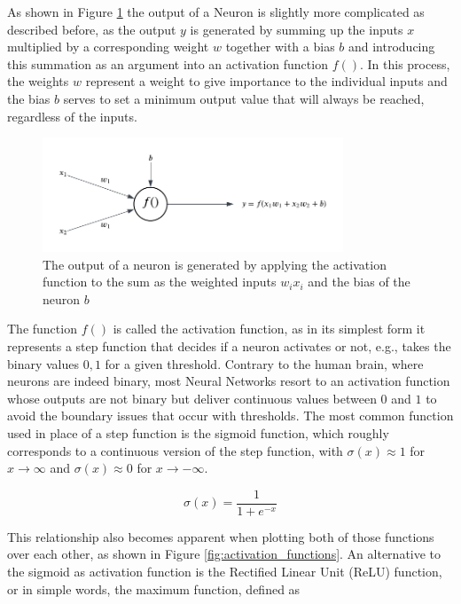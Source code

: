 As shown in Figure \ref{fig:neuron_calculations} the output of a Neuron is slightly more complicated as described before, as the output $y$ is generated by summing up the inputs $x$ multiplied by a corresponding weight $w$ together with a bias $b$ and introducing this summation as an argument into an activation function $f()$. In this process, the weights $w$ represent a weight to give importance to the individual inputs and the bias $b$ serves to set a minimum output value that will always be reached, regardless of the inputs. 

\begin{figure}[h] 
	\centering
	\includegraphics[width=0.8\textwidth]{../figures/modelling/perceptron_concept.png} %
	\caption{The output of a neuron is generated by applying the activation function to the sum as the weighted inputs $w_ix_i$ and the bias of the neuron $b$}
	\label{fig:neuron_calculations}
\end{figure}

The function $f()$ is called the activation function, as in its simplest form it represents a step function that decides if a neuron activates or not, e.g., takes the binary values ${0,1}$ for a given threshold. Contrary to the human brain, where neurons are indeed binary, most Neural Networks resort to an activation function whose outputs are not binary but deliver continuous values between $0$ and $1$ to avoid the boundary issues that occur with thresholds. The most common function used in place of a step function is the sigmoid function, which roughly corresponds to a continuous version of the step function, with $\sigma(x) \approx 1$ for $x \to \infty$ and $\sigma(x) \approx 0$ for $x \to -\infty$.


\[
\sigma(x) = \frac{1}{1 + e^{-x}}
\]

This relationship also becomes apparent when plotting both of those functions over each other, as shown in Figure \ref{fig:activation_functions}. 
An alternative to the sigmoid as activation function is the Rectified Linear Unit (ReLU) function, or in simple words, the maximum function, defined as


